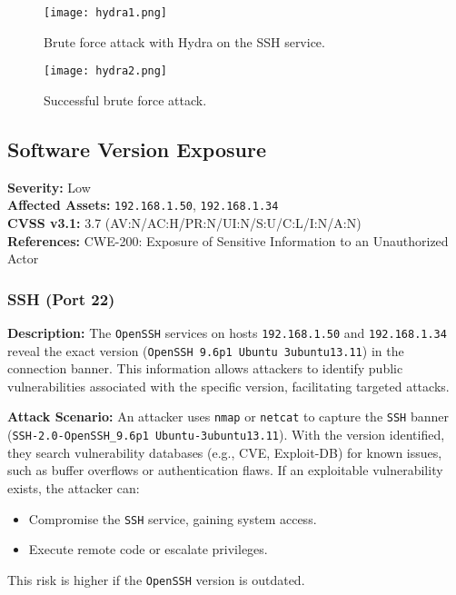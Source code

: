 \documentclass[a4paper,12pt]{article}
\begin{document}
\begin{figure}[ht]
    \centering
    \texttt{[image: hydra1.png]}
    \caption{Brute force attack with Hydra on the SSH service.}
\end{figure}

\begin{figure}[ht]
    \centering
    \texttt{[image: hydra2.png]}
    \caption{Successful brute force attack.}
\end{figure}

\clearpage

\subsection{Software Version Exposure}
\textbf{Severity:} \textcolor{NavyBlue}{Low} \\
\textbf{Affected Assets:} \texttt{192.168.1.50}, \texttt{192.168.1.34} \\
\textbf{CVSS v3.1:} 3.7 (AV:N/AC:H/PR:N/UI:N/S:U/C:L/I:N/A:N) \\
\textbf{References:} CWE-200: Exposure of Sensitive Information to an Unauthorized Actor

\subsubsection{SSH (Port 22)}
\textbf{Description:}  
The \texttt{OpenSSH} services on hosts \texttt{192.168.1.50} and \texttt{192.168.1.34} reveal the exact version (\texttt{OpenSSH 9.6p1 Ubuntu 3ubuntu13.11}) in the connection banner. This information allows attackers to identify public vulnerabilities associated with the specific version, facilitating targeted attacks.

\textbf{Attack Scenario:}  
An attacker uses \texttt{nmap} or \texttt{netcat} to capture the \texttt{SSH} banner (\texttt{SSH-2.0-OpenSSH\_9.6p1 Ubuntu-3ubuntu13.11}). With the version identified, they search vulnerability databases (e.g., CVE, Exploit-DB) for known issues, such as buffer overflows or authentication flaws. If an exploitable vulnerability exists, the attacker can:  
\begin{itemize}
    \item Compromise the \texttt{SSH} service, gaining system access.  
    \item Execute remote code or escalate privileges.  
\end{itemize}
This risk is higher if the \texttt{OpenSSH} version is outdated.
\end{document}
